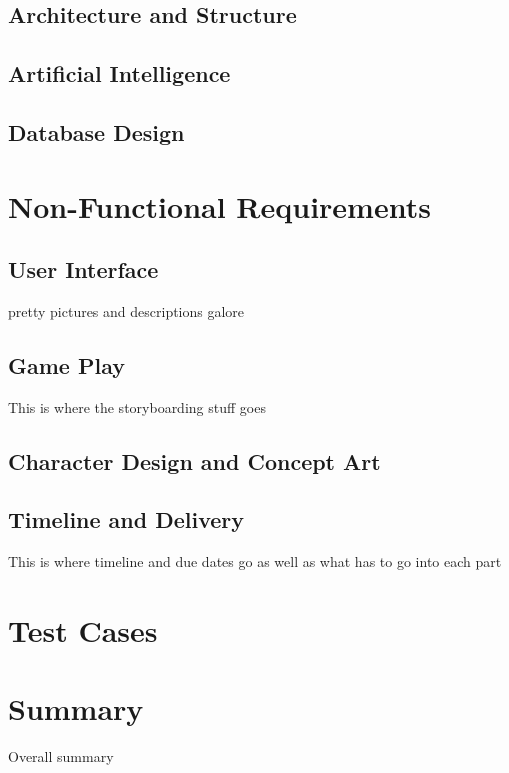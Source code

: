 \documentclass[12pt]{IEEEtran}
\begin{document}
\subsection{Architecture and Structure}
\label{subsec:arch}

\subsection{Artificial Intelligence}
\label{subsec:ai}

\subsection{Database Design}
\label{subsec:dbdesign}

\section{Non-Functional Requirements}
\label{sec:nonFuncReq}

\subsection{User Interface}
\label{subsec:ui}

pretty pictures and descriptions galore

\subsection{Game Play}
\label{subsec:gameplay}

	This is where the storyboarding stuff goes

\subsection{Character Design and Concept Art}
\label{subsec:cdesign}

\subsection{Timeline and Delivery}
\label{subsec:timeline}

	This is where timeline and due dates go as well as what has to go into each part

\section{Test Cases}
\label{sec:test}

\section{Summary}
\label{sec:summary}

	Overall summary
\end{document}
